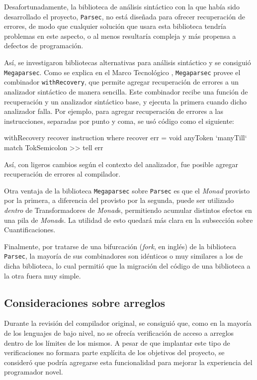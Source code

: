 Desafortunadamente, la biblioteca de análisis sintáctico con la que había sido
desarrollado el proyecto, \texttt{Parsec}, no está diseñada para ofrecer
recuperación de errores, de modo que cualquier solución que usara esta
biblioteca tendría problemas en este aspecto, o al menos resultaría compleja y
más propensa a defectos de programación.

Así, se investigaron bibliotecas alternativas para análisis sintáctico y se
consiguió \texttt{Megaparsec}. Como se explica en el Marco Tecnológico
, \texttt{Megaparsec} provee el
combinador \texttt{withRecovery}, que permite agregar recuperación de errores a
un analizador sintáctico de manera sencilla. Este combinador recibe una función
de recuperación y un analizador sintáctico base, y ejecuta la primera cuando
dicho analizador falla. Por ejemplo, para agregar recuperación de errores a las
instrucciones, separadas por punto y coma, se usó código como el siguiente:

\begin{haskellcode}
  withRecovery recover instruction
    where
      recover err = void anyToken `manyTill` match TokSemicolon >> tell err
\end{haskellcode}

Así, con ligeros cambios según el contexto del analizador, fue posible agregar
recuperación de errores al compilador.

Otra ventaja de la biblioteca \texttt{Megaparsec} sobre \texttt{Parsec} es que
el \emph{Monad} provisto por la primera, a diferencia del provisto por la
segunda, puede ser utilizado \emph{dentro} de Transformadores de \emph{Monad}s,
permitiendo acumular distintos efectos en una pila de \emph{Monad}s. La utilidad
de esto quedará más clara en la subsección sobre Cuantificaciones.

Finalmente, por tratarse de una bifurcación (\emph{fork}, en inglés) de la
biblioteca \texttt{Parsec}, la mayoría de sus combinadores son idénticos o muy
similares a los de dicha biblioteca, lo cual permitió que la migración del
código de una biblioteca a la otra fuera muy simple.

\subsection{Consideraciones sobre arreglos}

Durante la revisión del compilador original, se consiguió que, como en la
mayoría de los lenguajes de bajo nivel, no se ofrecía verificación de acceso a
arreglos dentro de los límites de los mismos. A pesar de que implantar este tipo
de verificaciones no formara parte explícita de los objetivos del proyecto, se
consideró que podría agregarse esta funcionalidad para mejorar la experiencia
del programador novel. 


